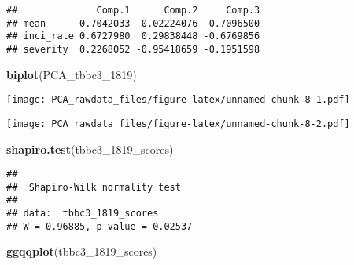 \documentclass[]{article}
\newenvironment{Shaded}{\begin{snugshade}}{\end{snugshade}}
\newcommand{\CommentTok}[1]{\textcolor[rgb]{0.56,0.35,0.01}{\textit{#1}}}
\newcommand{\DecValTok}[1]{\textcolor[rgb]{0.00,0.00,0.81}{#1}}
\newcommand{\KeywordTok}[1]{\textcolor[rgb]{0.13,0.29,0.53}{\textbf{#1}}}
\newcommand{\NormalTok}[1]{#1}
\newcommand{\OperatorTok}[1]{\textcolor[rgb]{0.81,0.36,0.00}{\textbf{#1}}}
\newcommand{\StringTok}[1]{\textcolor[rgb]{0.31,0.60,0.02}{#1}}
\begin{document}
\begin{Shaded}
\end{Shaded}

\begin{verbatim}
##              Comp.1      Comp.2     Comp.3
## mean      0.7042033  0.02224076  0.7096500
## inci_rate 0.6727980  0.29838448 -0.6769856
## severity  0.2268052 -0.95418659 -0.1951598
\end{verbatim}

\begin{Shaded}
\begin{Highlighting}[]
\KeywordTok{biplot}\NormalTok{(PCA_tbbc3_}\DecValTok{1819}\NormalTok{)}
\end{Highlighting}
\end{Shaded}

\texttt{[image: PCA\_rawdata\_files/figure-latex/unnamed-chunk-8-1.pdf]}

\begin{Shaded}
\end{Shaded}

\texttt{[image: PCA\_rawdata\_files/figure-latex/unnamed-chunk-8-2.pdf]}

\begin{Shaded}
\begin{Highlighting}[]
\KeywordTok{shapiro.test}\NormalTok{(tbbc3_}\DecValTok{1819}\NormalTok{_scores)}
\end{Highlighting}
\end{Shaded}

\begin{verbatim}
## 
##  Shapiro-Wilk normality test
## 
## data:  tbbc3_1819_scores
## W = 0.96885, p-value = 0.02537
\end{verbatim}

\begin{Shaded}
\begin{Highlighting}[]
\KeywordTok{ggqqplot}\NormalTok{(tbbc3_}\DecValTok{1819}\NormalTok{_scores)}
\end{Highlighting}
\end{Shaded}
\end{document}
